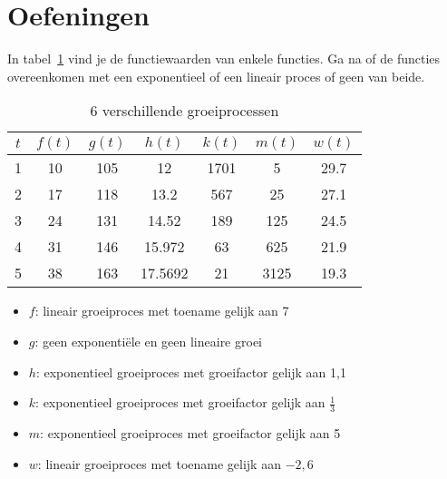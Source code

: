 %
% 
% 

\section{Oefeningen}


\begin{oef}    
In tabel~\ref{tbl:6processen} vind je de functiewaarden van enkele functies. 
Ga na of de functies overeenkomen met een exponentieel of een lineair proces of geen van beide.
\begin{table}[htb]
  \centering
  \caption{6 verschillende groeiprocessen}
  \begin{tabular}{ccccccc}
    \toprule
    $t$ & $f(t)$ & $g(t)$ & $h(t)$ & $k(t)$ & $m(t)$ & $w(t)$ \\
    \midrule
    1 & 10 & 105 & 12 & 1701 & 5 & \num{29.7}  \\
    2 & 17 & 118 & \num{13.2} & 567 & 25 & \num{27.1}  \\
    3 & 24 & 131 & \num{14.52} & 189 & 125 & \num{24.5}  \\
    4 & 31 & 146 & \num{15.972} & 63 & 625 & \num{21.9}  \\
    5 & 38 & 163 & \num{17.5692} & 21 & 3125 & \num{19.3}  \\
    \bottomrule
  \end{tabular}
   \label{tbl:6processen}
\end{table}
\begin{opl}
\begin{itemize}
\item $f$: lineair groeiproces met toename gelijk aan 7
\item $g$: geen exponenti\"ele en geen lineaire groei
\item $h$: exponentieel groeiproces met groeifactor gelijk aan 1,1
\item $k$: exponentieel groeiproces met groeifactor gelijk aan $\frac13$
\item $m$: exponentieel groeiproces met groeifactor gelijk aan 5
\item $w$: lineair groeiproces met toename gelijk aan $-2,6$
\end{itemize}
\end{opl}
\end{oef}


